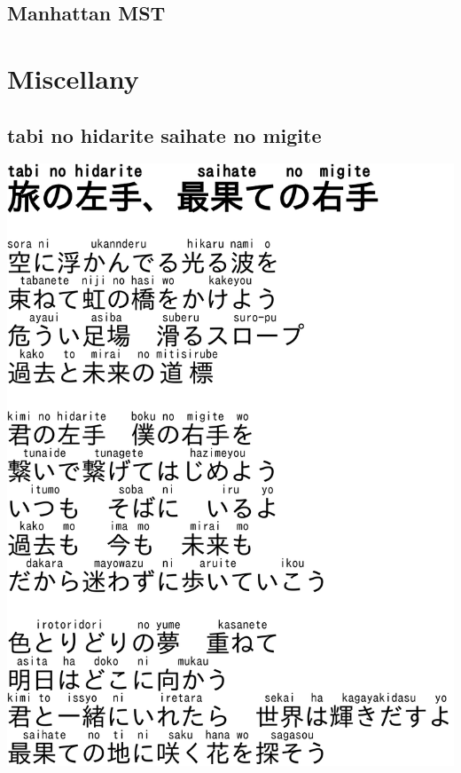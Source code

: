 \documentclass[a4paper,10pt,twocolumn,oneside]{article}
\begin{document}
\subsection{Manhattan MST}


\clearpage
\section{Miscellany}
\subsection{tabi no hidarite saihate no migite}
\includegraphics{../images/tabinohidaritesaihatenomigite}
\clearpage
\end{document}
